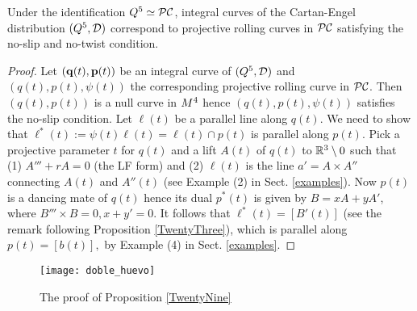 \begin{proposition}\label{TwentyNine}
Under the identification $ Q^5\simeq\mathcal{PC}$, integral curves of the Cartan-Engel distribution $(Q^5,{\mathcal D})$ correspond to projective rolling  curves in $\mathcal{PC}$ satisfying the no-slip and no-twist condition. 


\end{proposition}

\begin{proof}  Let $(\mathbf q(t), {\mathbf p}(t))$ be an integral curve of $(Q^5, {\mathcal D})$ and $(q(t), p(t), \psi(t))$  the corresponding projective rolling curve in $\mathcal{PC}$. Then $(q(t), p(t))$ is a null curve in $M^4$ hence $(q(t), p(t), \psi(t))$ satisfies the no-slip condition.  Let $\ell(t)$ be a parallel line along $q(t)$. We need to show that $\ell^*(t):=\psi(t)\ell(t)=\ell(t)\cap p(t)$ is parallel along $p(t)$. Pick a projective parameter $t$   for  $q(t)$ and    a lift $A(t)$ of $q(t)$ to $\mathbb{R}^3\setminus 0$ such that 
  (1) $A'''+rA=0$ (the LF form) and (2) $\ell(t)$ is the line $a'=A\times A''$ connecting $A(t)$ and $A''(t)$ (see Example (2)  in Sect. \ref{examples}). Now $p(t)$ is a dancing mate of $q(t)$ hence  its dual $p^*(t)$  is  given   by $B =xA+yA'$, where $B'''\times B=0, x+y'=0$. It follows that  $\ell^*(t)=[B'(t)]$ (see the remark following Proposition \ref{TwentyThree}),  which is parallel along $p(t)=[b(t)],$ by  Example (4)  in Sect. \ref{examples}. \end{proof} 
  
\begin{figure}[H]\centering
\texttt{[image: doble\_huevo]}
\caption{\small The proof of Proposition \ref{TwentyNine}}
\end{figure}









